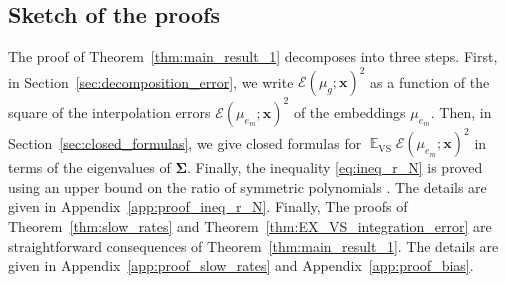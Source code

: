 \documentclass[twoside,11pt]{book}
\DeclareMathOperator{\VS}{\mathrm{VS}}
\DeclareMathOperator{\EX}{\mathbb{E}}
\DeclareMathOperator{\F}{\mathcal{F}}
\begin{document}


\subsection{Sketch of the proofs}\label{sec:steps_proof}
 The proof of Theorem~\ref{thm:main_result_1} decomposes into three steps. First, in Section~\ref{sec:decomposition_error}, we write $\mathcal{E}(\mu_{g};\bm{x})^{2}$ as a function of the square of the interpolation errors $\mathcal{E}(\mu_{e_{m}};\bm{x})^{2}$ of the embeddings
$\mu_{e_{m}}$. Then, in Section~\ref{sec:closed_formulas}, we give closed formulas for $\EX_{\VS} \mathcal{E}(\mu_{e_{m}};\bm{x})^{2}$ in terms of the eigenvalues of $\bm{\Sigma}$. Finally, the inequality \eqref{eq:ineq_r_N} is proved using an upper bound on the ratio of symmetric polynomials \citep{GuSi12}. The details are given in Appendix~\ref{app:proof_ineq_r_N}. Finally, The proofs of Theorem~\ref{thm:slow_rates} and Theorem~\ref{thm:EX_VS_integration_error} are straightforward consequences of Theorem~\ref{thm:main_result_1}. The details are given in Appendix~\ref{app:proof_slow_rates} and Appendix~\ref{app:proof_bias}.
\end{document}
